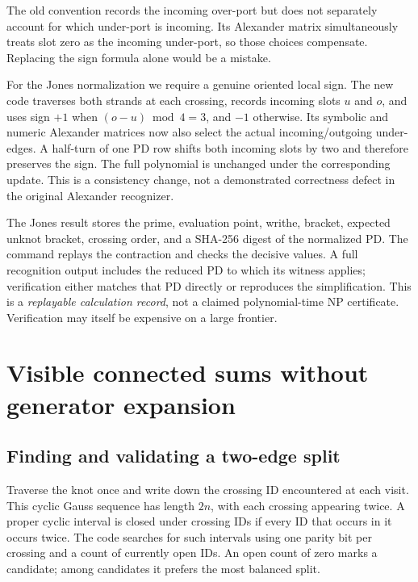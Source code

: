 \documentclass[11pt]{article}
\newcommand{\code}[1]{\texttt{\detokenize{#1}}}
\begin{document}
The old \code{signs()} convention records the incoming over-port but does not
separately account for which under-port is incoming. Its Alexander matrix
simultaneously treats slot zero as the incoming under-port, so those choices
compensate. Replacing the sign formula alone would be a mistake.

For the Jones normalization we require a genuine oriented local sign. The new
code traverses both strands at each crossing, records incoming slots $u$ and
$o$, and uses sign $+1$ when $(o-u)\bmod4=3$, and $-1$ otherwise. Its symbolic
and numeric Alexander matrices now also select the actual incoming/outgoing
under-edges. A half-turn of one PD row shifts both incoming slots by two and
therefore preserves the sign. The full polynomial is unchanged under the
corresponding update. This is a consistency change, not a demonstrated
correctness defect in the original Alexander recognizer.

The Jones result stores the prime, evaluation point, writhe, bracket, expected
unknot bracket, crossing order, and a SHA-256 digest of the normalized PD.
The \code{verify-jones} command replays the contraction and checks the decisive
values. A full recognition output includes the reduced PD to which its witness
applies; verification either matches that PD directly or reproduces the
simplification. This is a \emph{replayable calculation record}, not a claimed
polynomial-time NP certificate. Verification may itself be expensive on a
large frontier.

\section{Visible connected sums without generator expansion}\label{sec:factor}

\subsection{Finding and validating a two-edge split}

Traverse the knot once and write down the crossing ID encountered at each
visit. This cyclic Gauss sequence has length $2n$, with each crossing appearing
twice. A proper cyclic interval is closed under crossing IDs if every ID that
occurs in it occurs twice. The code searches for such intervals using one parity
bit per crossing and a count of currently open IDs. An open count of zero marks
a candidate; among candidates it prefers the most balanced split.
\end{document}
